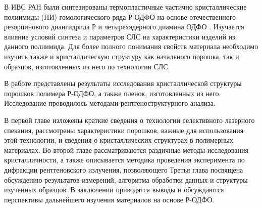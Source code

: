  В ИВС РАН были синтезированы термопластичные частично кристаллические полиимиды (ПИ) гомологического ряда Р-ОДФО на основе отечественного резорцинового диангидрида Р и четырехядерного диамина ОДФО  \cite{yudin-red}. Изучается влияние условий синтеза и параметров СЛС на характеристики изделий из данного полиимида. Для более полного понимания свойств материала необходимо изучить также и кристаллическую структуру как начального порошка, так и образцов, изготовленных из него по технологии СЛС.

В работе представлены результаты исследования кристаллической структуры  порошков полимера Р-ОДФО, а также пленок, изготовленных из него. Исследование проводилось методами рентгеноструктурного анализа.

В первой главе изложены краткие сведения о технологии селективного лазерного спекания, рассмотрены характеристики порошков, важные для использования этой технологии, и сведения о кристаллических структурах в полимерных материалах.
Во второй главе рассматриваются раздичные методы исследования кристалличности, а также описывается методика проведения эксперимента по дифракции рентгеновского излучения, позволяющего 
Третья глава посвящена обсуждению результатов измерений, алгоритма обработки данных и структуры изученных образцов.
В заключении приводятся выводы и обсуждаются перспективы дальнейшего изучения материалов на основе Р-ОДФО.
